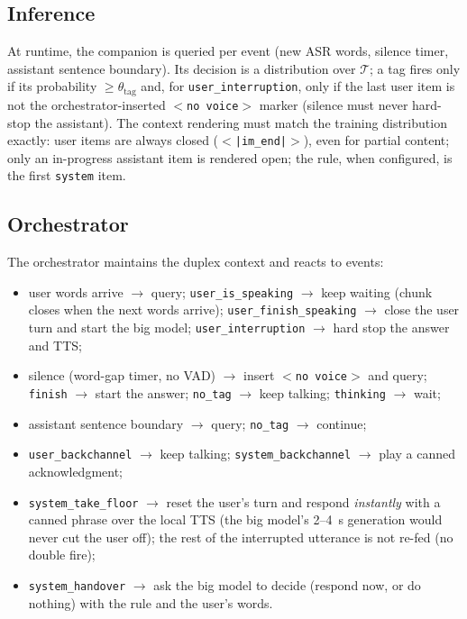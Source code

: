 \documentclass[conference]{IEEEtran}
\begin{document}
\subsection{Inference}
At runtime, the companion is queried per event (new ASR words, silence
timer, assistant sentence boundary). Its decision is a distribution over
$\mathcal{T}$; a tag fires only if its probability $\geq \theta_\text{tag}$
and, for \texttt{user\_interruption}, only if the last user item is not the
orchestrator-inserted \texttt{$<$no voice$>$} marker (silence must never
hard-stop the assistant). The context rendering must match the training
distribution exactly: user items are always closed
(\texttt{$<$|im\_end|$>$}), even for partial content; only an in-progress
assistant item is rendered open; the rule, when configured, is the first
\texttt{system} item.

\subsection{Orchestrator}
The orchestrator maintains the duplex context and reacts to events:

\begin{itemize}
\item user words arrive $\rightarrow$ query; \texttt{user\_is\_speaking}
$\rightarrow$ keep waiting (chunk closes when the next words arrive);
\texttt{user\_finish\_speaking} $\rightarrow$ close the user turn and start
the big model; \texttt{user\_interruption} $\rightarrow$ hard stop the
answer and TTS;
\item silence (word-gap timer, no VAD) $\rightarrow$ insert
\texttt{$<$no voice$>$} and query; \texttt{finish} $\rightarrow$ start the
answer; \texttt{no\_tag} $\rightarrow$ keep talking; \texttt{thinking}
$\rightarrow$ wait;
\item assistant sentence boundary $\rightarrow$ query; \texttt{no\_tag}
$\rightarrow$ continue;
\item \texttt{user\_backchannel} $\rightarrow$ keep talking;
\texttt{system\_backchannel} $\rightarrow$ play a canned acknowledgment;
\item \texttt{system\_take\_floor} $\rightarrow$ reset the user's turn and
respond \emph{instantly} with a canned phrase over the local TTS (the big
model's 2--4~s generation would never cut the user off); the rest of the
interrupted utterance is not re-fed (no double fire);
\item \texttt{system\_handover} $\rightarrow$ ask the big model to decide
(respond now, or do nothing) with the rule and the user's words.
\end{itemize}
\end{document}
